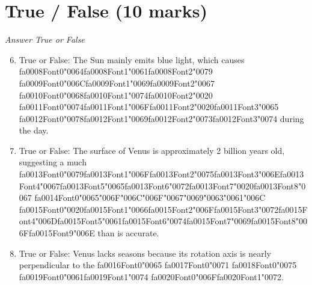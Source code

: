\documentclass[12pt]{article}
\begin{document}
\section*{True / False (10 marks)}
\textit{Answer True or False}
\begin{enumerate}[label=\arabic*.]
\setcounter{enumi}{5}
\item True or False: The Sun mainly emits blue light, which causes {\csname fa0008Font0\endcsname\char"0064}{\csname fa0008Font1\endcsname\char"0061}{\csname fa0008Font2\endcsname\char"0079} {\csname fa0009Font0\endcsname\char"006C}{\csname fa0009Font1\endcsname\char"0069}{\csname fa0009Font2\endcsname\char"0067} {\csname fa0010Font0\endcsname\char"0068}{\csname fa0010Font1\endcsname\char"0074}{\csname fa0010Font2\endcsname\char"0020} {\csname fa0011Font0\endcsname\char"0074}{\csname fa0011Font1\endcsname\char"006F}{\csname fa0011Font2\endcsname\char"0020}{\csname fa0011Font3\endcsname\char"0065} {\csname fa0012Font0\endcsname\char"0078}{\csname fa0012Font1\endcsname\char"0069}{\csname fa0012Font2\endcsname\char"0073}{\csname fa0012Font3\endcsname\char"0074} during the day.
\item True or False: The surface of Venus is approximately 2 billion years old, suggesting a much {\csname fa0013Font0\endcsname\char"0079}{\csname fa0013Font1\endcsname\char"006F}{\csname fa0013Font2\endcsname\char"0075}{\csname fa0013Font3\endcsname\char"006E}{\csname fa0013Font4\endcsname\char"0067}{\csname fa0013Font5\endcsname\char"0065}{\csname fa0013Font6\endcsname\char"0072}{\csname fa0013Font7\endcsname\char"0020}{\csname fa0013Font8\endcsname\char"0067} {\csname fa0014Font0\endcsname\char"0065}{\char"006F}{\char"006C}{\char"006F}{\char"0067}{\char"0069}{\char"0063}{\char"0061}{\char"006C} {\csname fa0015Font0\endcsname\char"0020}{\csname fa0015Font1\endcsname\char"0066}{\csname fa0015Font2\endcsname\char"006F}{\csname fa0015Font3\endcsname\char"0072}{\csname fa0015Font4\endcsname\char"006D}{\csname fa0015Font5\endcsname\char"0061}{\csname fa0015Font6\endcsname\char"0074}{\csname fa0015Font7\endcsname\char"0069}{\csname fa0015Font8\endcsname\char"006F}{\csname fa0015Font9\endcsname\char"006E} than is accurate.
\item True or False: Venus lacks seasons because its rotation axis is nearly perpendicular to the {\csname fa0016Font0\endcsname\char"0065} {\csname fa0017Font0\endcsname\char"0071} {\csname fa0018Font0\endcsname\char"0075} {\csname fa0019Font0\endcsname\char"0061}{\csname fa0019Font1\endcsname\char"0074} {\csname fa0020Font0\endcsname\char"006F}{\csname fa0020Font1\endcsname\char"0072}.

\end{enumerate}
\end{document}
